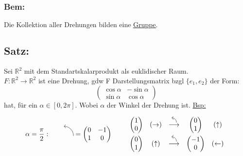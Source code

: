 \documentclass[titlepage,12pt,a4paper,ngerman]{report}
\begin{document}
\subsubsection{Bem:}
Die Kollektion aller Drehungen bilden eine \underline{\underline{Gruppe}}.

\subsection{Satz:}
Sei $ \mathbb{R}^2 $ mit dem Standartskalarprodukt als euklidischer Raum.\\
$F: \mathbb{R}^2 \to \mathbb{R}^2$ ist eine Drehung, gdw F Darstellungsmatrix bzgl $ \{e_1,e_2\} $ der Form:
$$\begin{pmatrix}
\cos \alpha & - \sin \alpha \\
\sin \alpha & \cos \alpha
\end{pmatrix}$$
hat, für ein $ \alpha \in [0, 2\pi] $. Wobei $ \alpha $ der Winkel der Drehung ist.
\underline{Bsp:}

$$ \alpha = \frac{\pi}{2} :\qquad \begin{tikzpicture}
\draw[->] (0,0) to [out=90,in=0] (-.5,.5);
\end{tikzpicture} = \begin{pmatrix}
0 & -1\\
1 & 0
\end{pmatrix}\qquad 
\begin{array}{ccccc}
\begin{pmatrix}
1\\0
\end{pmatrix}& (\rightarrow) & \buildrel \begin{tikzpicture}
\draw[->] (0,0) to [out=90,in=0] (-.25,.25);
\end{tikzpicture} \over \longrightarrow & \begin{pmatrix}
0\\1
\end{pmatrix}& (\uparrow)\\[10pt]
\begin{pmatrix}
0\\1
\end{pmatrix}& (\uparrow) & \buildrel \begin{tikzpicture}
\draw[->] (0,0) to [out=90,in=0] (-.25,.25);
\end{tikzpicture} \over \longrightarrow & \begin{pmatrix}
-1\\0
\end{pmatrix}& (\leftarrow)
\end{array}$$
\end{document}
